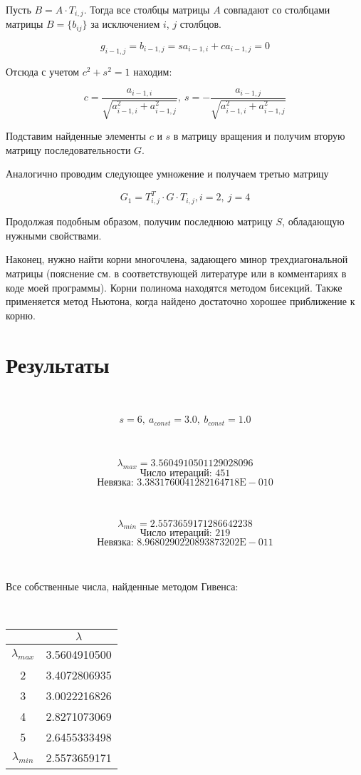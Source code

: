 \documentclass[12pt,a4paper]{article}
\begin{document}
Пусть $B = A \cdot T_{i,j}$. Тогда все столбцы матрицы $A$ совпадают со столбцами матрицы $B = \{ b_{ij} \} $ за исключением $i$, $j$ столбцов.

$$
 g_{i-1,j} = b_{i-1,j} = sa_{i-1,i} + ca_{i-1,j} = 0
$$

Отсюда с учетом $c^2 + s^2 = 1$ находим:

$$
 c = \frac{a_{i-1,i}}{\sqrt{a_{i-1,i}^2 + a_{i-1,j}^2}}, \ 
 s = - \frac{a_{i-1,j}}{\sqrt{a_{i-1,i}^2 + a_{i-1,j}^2}}
$$

Подставим найденные элементы $c$ и $s$ в матрицу вращения и получим вторую матрицу последовательности $G$.

Аналогично проводим следующее умножение и получаем третью матрицу

$$
 G_1 = T_{i,j}^T \cdot G \cdot T_{i,j}, i=2, \ j=4
$$ 

Продолжая подобным образом, получим последнюю матрицу $S$, обладающую нужными свойствами.

Наконец, нужно найти корни многочлена, задающего минор трехдиагональной матрицы (пояснение см. в соответствующей литературе или в комментариях в коде моей программы). Корни полинома находятся методом бисекций. Также применяется метод Ньютона, когда найдено достаточно хорошее приближение к корню.

\section{Результаты}

\

$$ s=6, \ a_{const}=3.0, \ b_{const}=1.0 $$

\

$$ \lambda_{max} = 3.5604910501129028096 $$
$$ \text{Число итераций: } 451 $$
$$ \text{Невязка: } 3.3831760041282164718\text{E}-010 $$

\

$$ \lambda_{min} = 2.5573659171286642238 $$
$$ \text{Число итераций: } 219 $$
$$ \text{Невязка: } 8.9680290220893873202\text{E}-011 $$

\

Все собственные числа, найденные методом Гивенса:

\

\begin{center}


\begin{tabular}{cc}
 & $\lambda$ \\
 \hline
 $\lambda_{max}$  &  3.5604910500 \\
 2  &  3.4072806935 \\
 3  &  3.0022216826 \\
 4  &  2.8271073069 \\
 5  &  2.6455333498 \\
 $\lambda_{min}$  &  2.5573659171
\end{tabular}

\end{center}
\end{document}
